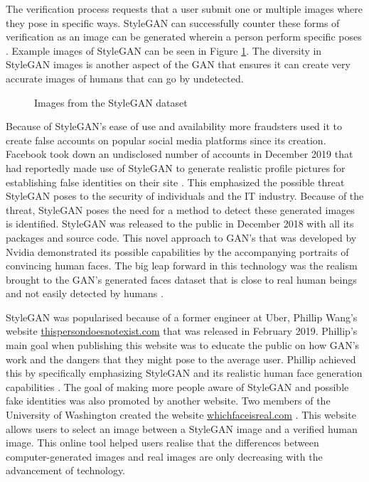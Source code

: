 The verification process requests that a user submit one or multiple images where they pose in specific ways. StyleGAN can successfully counter these forms of verification as an image can be generated wherein a person perform specific poses \citep{Karras2019}. Example images of StyleGAN can be seen in Figure \ref{fig:sggg}. The diversity in StyleGAN images is another aspect of the GAN that ensures it can create very accurate images of humans that can go by undetected.

\begin{figure}[H]%
\centering
{}%
\caption{Images from the StyleGAN dataset \cite{Karras2019}}%
\label{fig:sggg}%
\end{figure}

Because of StyleGAN’s ease of use and availability more fraudsters used it to create false accounts on popular social media platforms since its creation. Facebook took down an undisclosed number of accounts in December 2019 that had reportedly made use of StyleGAN to generate realistic profile pictures for establishing false identities on their site \citep{Gallagher2019}. This emphasized the possible threat StyleGAN poses to the security of individuals and the IT industry. Because of the threat, StyleGAN poses the need for a method to detect these generated images is identified. StyleGAN was released to the public in December 2018 with all its packages and source code. This novel approach to GAN’s that was developed by Nvidia demonstrated its possible capabilities by the accompanying portraits of convincing human faces. The big leap forward in this technology was the realism brought to the GAN’s generated faces dataset that is close to real human beings and not easily detected by humans \citep{Fleishman2019, Karras2019}.

StyleGAN was popularised because of a former engineer at Uber, Phillip Wang’s website \href{https://www.thispersondoesnotexist.com}{thispersondoesnotexist.com} that was released in February 2019. Phillip’s main goal when publishing this website was to educate the public on how GAN’s work and the dangers that they might pose to the average user. Phillip achieved this by specifically emphasizing StyleGAN and its realistic human face generation capabilities \cite{Fleishman2019}. The goal of making more people aware of StyleGAN and possible fake identities was also promoted by another website. Two members of the University of Washington created the website \href{https://www.whichfaceisreal.com}{whichfaceisreal.com} \cite{Fleishman2019}. This website allows users to select an image between a StyleGAN image and a verified human image. This online tool helped users realise that the differences between computer-generated images and real images are only decreasing with the advancement of technology.

